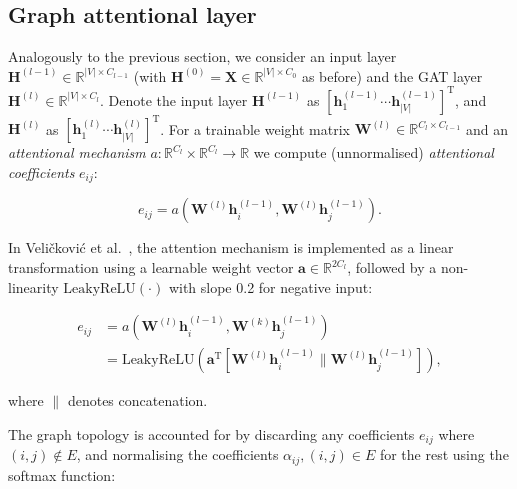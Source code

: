 
\subsection{Graph attentional layer}
Analogously to the previous section, we consider an input layer $\mathbf{H}^{(l-1)} \in \mathbb{R}^{|V|\times C_{l-1}}$ (with $\mathbf{H}^{(0)} = \mathbf{X} \in \mathbb{R}^{|V|\times C_{0}}$ as before) and the GAT layer $\mathbf{H}^{(l)} \in \mathbb{R}^{|V|\times C_{l}}$. Denote the input layer $\mathbf{H}^{(l-1)}$ as $[\mathbf{h}_1^{(l-1)} \cdots \mathbf{h}_{|V|}^{(l-1)}]^{\mathrm{T}}$, and $\mathbf{H}^{(l)}$ as $[\mathbf{h}_1^{(l)} \cdots \mathbf{h}_{|V|}^{(l)}]^{\mathrm{T}}$. For a trainable weight matrix $\mathbf{W}^{(l)} \in \mathbb{R}^{C_{l} \times C_{l-1}}$ and an \textit{attentional mechanism} $a: \mathbb{R}^{C_{l}} \times \mathbb{R}^{C_{l}} \rightarrow \mathbb{R}$ we compute (unnormalised) \textit{attentional coefficients} $e_{ij}$:

\begin{equation}
    e_{ij} = a(\mathbf{W}^{(l)}\mathbf{h}_i^{(l-1)}, \mathbf{W}^{(l)}\mathbf{h}_j^{(l-1)}).
\end{equation}

In Veli{\v{c}}kovi\'{c} et al.~\cite{velickovic2018graph}, the attention mechanism is implemented as a linear transformation using a learnable weight vector $\mathbf{a} \in \mathbb{R}^{2C_{l}}$, followed by a non-linearity $\mathrm{LeakyReLU}(\cdot)$ with slope 0.2 for negative input:

\begin{align}
    e_{ij} &= a(\mathbf{W}^{(l)}\mathbf{h}_i^{(l-1)}, \mathbf{W}^{(k)}\mathbf{h}_j^{(l-1)}) \\
    &= \mathrm{LeakyReLU}(\mathbf{a}^{\mathrm{T}}[\mathbf{W}^{(l)}\mathbf{h}_i^{(l-1)} \parallel \mathbf{W}^{(l)}\mathbf{h}_j^{(l-1)}]),
\end{align}

where $\parallel$ denotes concatenation.

The graph topology is accounted for by discarding any coefficients $e_{ij}$ where $(i, j) \notin E$, and normalising the coefficients $\alpha_{ij}, (i, j) \in E$ for the rest using the softmax function:

